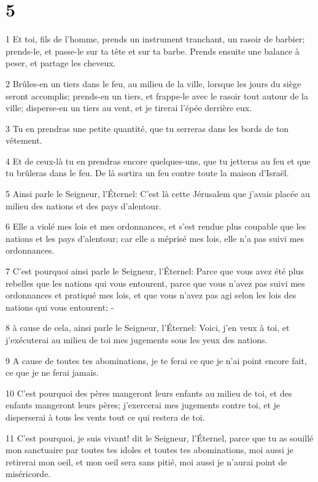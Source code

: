 \chapter{5}

\par 1 Et toi, fils de l'homme, prends un instrument tranchant, un rasoir de barbier; prends-le, et passe-le sur ta tête et sur ta barbe. Prends ensuite une balance à peser, et partage les cheveux.
\par 2 Brûles-en un tiers dans le feu, au milieu de la ville, lorsque les jours du siège seront accomplis; prends-en un tiers, et frappe-le avec le rasoir tout autour de la ville; disperse-en un tiers au vent, et je tirerai l'épée derrière eux.
\par 3 Tu en prendras une petite quantité, que tu serreras dans les bords de ton vêtement.
\par 4 Et de ceux-là tu en prendras encore quelques-uns, que tu jetteras au feu et que tu brûleras dans le feu. De là sortira un feu contre toute la maison d'Israël.
\par 5 Ainsi parle le Seigneur, l'Éternel: C'est là cette Jérusalem que j'avais placée au milieu des nations et des pays d'alentour.
\par 6 Elle a violé mes lois et mes ordonnances, et s'est rendue plus coupable que les nations et les pays d'alentour; car elle a méprisé mes lois, elle n'a pas suivi mes ordonnances.
\par 7 C'est pourquoi ainsi parle le Seigneur, l'Éternel: Parce que vous avez été plus rebelles que les nations qui vous entourent, parce que vous n'avez pas suivi mes ordonnances et pratiqué mes lois, et que vous n'avez pas agi selon les lois des nations qui vous entourent; -
\par 8 à cause de cela, ainsi parle le Seigneur, l'Éternel: Voici, j'en veux à toi, et j'exécuterai au milieu de toi mes jugements sous les yeux des nations.
\par 9 A cause de toutes tes abominations, je te ferai ce que je n'ai point encore fait, ce que je ne ferai jamais.
\par 10 C'est pourquoi des pères mangeront leurs enfants au milieu de toi, et des enfants mangeront leurs pères; j'exercerai mes jugements contre toi, et je disperserai à tous les vents tout ce qui restera de toi.
\par 11 C'est pourquoi, je suis vivant! dit le Seigneur, l'Éternel, parce que tu as souillé mon sanctuaire par toutes tes idoles et toutes tes abominations, moi aussi je retirerai mon oeil, et mon oeil sera sans pitié, moi aussi je n'aurai point de miséricorde.
